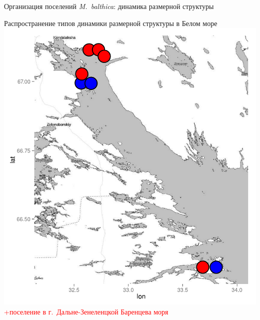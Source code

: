 \documentclass{beamer}
\begin{document}
\begin{frame}{Организация поселений {\it M.~balthica}: динамика размерной структуры}
	\begin{minipage}[t]{.53\linewidth}
		\begin{center}
			{\scriptsize Распространение типов динамики размерной структуры в Белом море}\\
			\includegraphics[width=\textwidth]{map_size_distr.pdf}\\
\textcolor{red}{\scriptsize +поселение в г.~Дальне-Зенеленцкой Баренцева моря}
		\end{center}


\end{minipage}
\end{frame}
\end{document}

